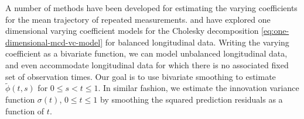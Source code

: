 A number of methods have been developed for estimating the varying coefficients for the mean trajectory of repeated measurements. \cite{wu2003nonparametric} and \cite{dahlhaus1997fitting} have explored one dimensional varying coefficient models for the Cholesky decomposition \eqref{eq:one-dimensional-mcd-vc-model} for balanced longitudinal data. Writing the varying coefficient as a bivariate function, we can model unbalanced longitudinal data, and even accommodate longitudinal data for which there is no associated fixed set of observation times. Our goal is to use bivariate smoothing to estimate $\tilde{\phi}\left(t,s\right)$ for $0 \le s < t \le 1$. In similar fashion, we estimate the innovation variance function $\sigma\left(t \right)$, $0 \le t \le 1$ by smoothing the squared prediction residuals as a function of $t$. 

\bigskip

